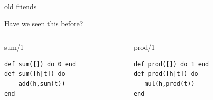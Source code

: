 \begin{frame}[fragile]{old friends}

Have we seen this before?

\pause\vspace{20pt}
\begin{columns}
   \begin{column}{.5\linewidth}
     \begin{block}{sum/1}
       \begin{verbatim}
def sum([]) do 0 end
def sum([h|t]) do
    add(h,sum(t))
end
       \end{verbatim}
       \vfill
     \end{block}
   \end{column} 
\pause
   \begin{column}{.5\linewidth}
     \begin{block}{prod/1}
       \begin{verbatim}
def prod([]) do 1 end
def prod([h|t]) do
   mul(h,prod(t))
end
       \end{verbatim}
       \vfill
     \end{block}
   \end{column}
  \end{columns}

\vspace{20pt}{\em There is no built-in add/2, nor mul/2, but we can pretend that there is.}

\end{frame}



